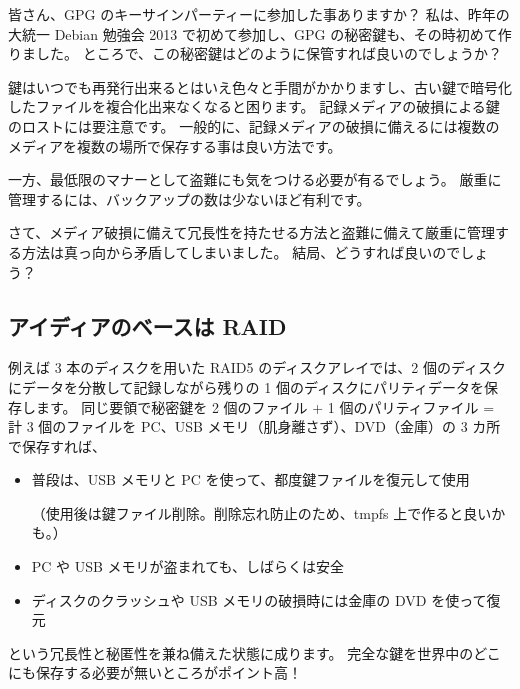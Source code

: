 \documentclass[mingoth,a4paper]{jsarticle}
\begin{document}
皆さん、GPG のキーサインパーティーに参加した事ありますか？
私は、昨年の大統一 Debian 勉強会 2013 で初めて参加し、GPG の秘密鍵も、その時初めて作りました。
ところで、この秘密鍵はどのように保管すれば良いのでしょうか？

鍵はいつでも再発行出来るとはいえ色々と手間がかかりますし、古い鍵で暗号化したファイルを複合化出来なくなると困ります。
記録メディアの破損による鍵のロストには要注意です。
一般的に、記録メディアの破損に備えるには複数のメディアを複数の場所で保存する事は良い方法です。

一方、最低限のマナーとして盗難にも気をつける必要が有るでしょう。
厳重に管理するには、バックアップの数は少ないほど有利です。

さて、メディア破損に備えて冗長性を持たせる方法と盗難に備えて厳重に管理する方法は真っ向から矛盾してしまいました。
結局、どうすれば良いのでしょう？

\subsection{アイディアのベースは RAID}

例えば 3 本のディスクを用いた RAID5 のディスクアレイでは、2 個のディスクにデータを分散して記録しながら残りの 1 個のディスクにパリティデータを保存します。
同じ要領で秘密鍵を 2 個のファイル + 1 個のパリティファイル = 計 3 個のファイルを PC、USB メモリ（肌身離さず）、DVD（金庫）の 3 カ所で保存すれば、
\begin{itemize}
\item 普段は、USB メモリと PC を使って、都度鍵ファイルを復元して使用

  （使用後は鍵ファイル削除。削除忘れ防止のため、tmpfs 上で作ると良いかも。）
\item PC や USB メモリが盗まれても、しばらくは安全
\item ディスクのクラッシュや USB メモリの破損時には金庫の DVD を使って復元
\end{itemize}
という冗長性と秘匿性を兼ね備えた状態に成ります。
完全な鍵を世界中のどこにも保存する必要が無いところがポイント高！
\end{document}
